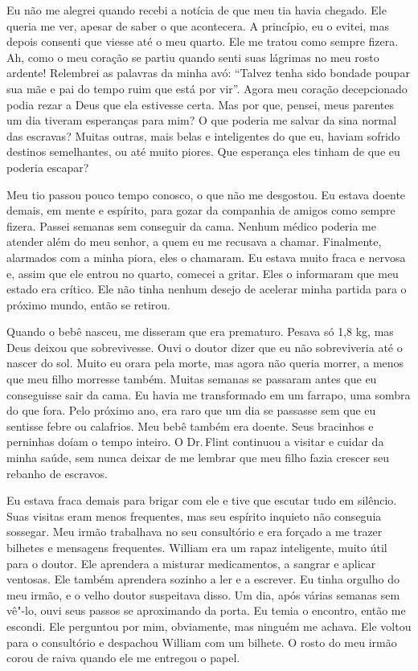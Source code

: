 Eu não me alegrei quando recebi a
notícia de que meu tia havia chegado. Ele queria me ver, apesar de saber
o que acontecera. A princípio, eu o evitei, mas depois consenti que
viesse até o meu quarto. Ele me tratou como sempre fizera. Ah, como o
meu coração se partiu quando senti suas lágrimas no meu rosto ardente!
Relembrei as palavras da minha avó: ``Talvez tenha sido bondade poupar
sua mãe e pai do tempo ruim que está por vir''. Agora meu coração
decepcionado podia rezar a Deus que ela estivesse certa. Mas por que,
pensei, meus parentes um dia tiveram esperanças para mim? O que poderia
me salvar da sina normal das escravas? Muitas outras, mais belas e
inteligentes do que eu, haviam sofrido destinos semelhantes, ou até
muito piores. Que esperança eles tinham de que eu poderia escapar?

Meu tio passou pouco tempo conosco, o
que não me desgostou. Eu estava doente demais, em mente e espírito, para
gozar da companhia de amigos como sempre fizera. Passei semanas sem
conseguir da cama. Nenhum médico poderia me atender além do meu senhor,
a quem eu me recusava a chamar. Finalmente, alarmados com a minha piora,
eles o chamaram. Eu estava muito fraca e nervosa e, assim que ele entrou
no quarto, comecei a gritar. Eles o informaram que meu estado era
crítico. Ele não tinha nenhum desejo de acelerar minha partida para o
próximo mundo, então se retirou.

Quando o bebê nasceu, me disseram que
era prematuro. Pesava só 1,8 kg, mas Deus deixou que sobrevivesse. Ouvi
o doutor dizer que eu não sobreviveria até o nascer do sol. Muito eu
orara pela morte, mas agora não queria morrer, a menos que meu filho
morresse também. Muitas semanas se passaram antes que eu conseguisse
sair da cama. Eu havia me transformado em um farrapo, uma sombra do que
fora. Pelo próximo ano, era raro que um dia se passasse sem que eu
sentisse febre ou calafrios. Meu bebê também era doente. Seus bracinhos
e perninhas doíam o tempo inteiro. O Dr.\,Flint continuou a visitar e
cuidar da minha saúde, sem nunca deixar de me lembrar que meu filho
fazia crescer seu rebanho de escravos.

Eu estava fraca demais para brigar com
ele e tive que escutar tudo em silêncio. Suas visitas eram menos
frequentes, mas seu espírito inquieto não conseguia sossegar. Meu irmão
trabalhava no seu consultório e era forçado a me trazer bilhetes e
mensagens frequentes. William era um rapaz inteligente, muito útil para
o doutor. Ele aprendera a misturar medicamentos, a sangrar e aplicar
ventosas. Ele também aprendera sozinho a ler e a escrever. Eu tinha
orgulho do meu irmão, e o velho doutor suspeitava disso. Um dia, após
várias semanas sem vê"-lo, ouvi seus passos se aproximando da porta. Eu
temia o encontro, então me escondi. Ele perguntou por mim, obviamente,
mas ninguém me achava. Ele voltou para o consultório e despachou William
com um bilhete. O rosto do meu irmão corou de raiva quando ele me
entregou o papel.

